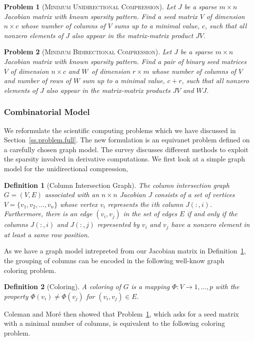 \documentclass[11pt, twoside,a4paper]{book}
\newtheorem{problem}{Problem}
\newtheorem{definition}{Definition}
\newcommand{\secref}[1]{Section~\protect\ref{#1}}
\newcommand{\defref}[1]{Definition~\protect\ref{#1}}
\newcommand{\col}{\ensuremath{c}}
\newcommand{\row}{\ensuremath{r}}
\newcommand{\MinUniCom}{\textsc{Minimum Unidirectional Compression}}
\newcommand{\MinBidCom}{\textsc{Minimum Bidirectional Compression}}
\begin{document}
\begin{problem}[\MinUniCom]
\label{p.seed.uni} Let $J$ be a sparse ${m\times n}$ Jacobian matrix with known sparsity
pattern. Find a seed matrix $V$ of dimension $n\times \col$
whose number of columns of $V$ sums up
to a minimal value, $\col$, such that all nonzero elements of $J$ also appear in
the matrix-matrix product $JV$.
\end{problem}

\begin{problem}[\MinBidCom]
\label{p.seed.bid} Let $J$ be a sparse ${m\times n}$ Jacobian matrix with known sparsity
pattern. Find a pair of binary seed matrices $V$ of dimension $n\times \col$ and $W$~of
dimension $\row \times m$ whose number of columns of $V$ and number of rows of $W$ sum up to a minimal value, $\col + \row$, such that all nonzero elements of $J$ also appear in
the matrix-matrix products $JV$ and $WJ$.
\end{problem}

\subsubsection{Combinatorial Model}
\label{s.modeling.full}
We reformulate the scientific computing problems which
we have discussed in \secref{ss.problem.full}.
The new formulation is an equivanet problem defined on a
carefully chosen graph model. The survey \cite{Gebremedhin05whatcolor}
discusses different methods
to exploit the sparsity involved in derivative computations.
We first look at a simple graph model for the unidirectional compression,
%
\begin{definition}[Column Intersection Graph]
\label{d:cig}
The column intersection graph $G = (V,E)$ associated with an $n \times n$ Jacobian $J$
consists of a set of vertices $V=\{v_1, v_2, \dots, v_n\}$ whose vertex $v_i$ represents
the $i$th column $J(:,i)$. Furthermore, there is an edge $(v_i,v_j)$ in the set of edges
$E$ if and only if the columns $J(:,i)$ and $J(:,j)$ represented by $v_i$ and $v_j$ have
a nonzero element in at least a same row position.
\end{definition}

As we have a graph model intrepreted from our Jacobian matrix in \defref{d:cig},
the grouping of columns can be encoded in the following well-know graph coloring problem.
%
\begin{definition}[Coloring]
A coloring of $G$ is a mapping $\Phi : V \to {1, \dots, p}$ with the property
$\Phi(v_i)\neq \Phi(v_j)$ for $(v_i,v_j) \in E$.
\end{definition}
%
Coleman and Mor\'{e} \cite{Coleman1983EoS} then showed that Problem~\ref{p.seed.uni}, which
asks for a seed matrix with a minimal number of columns, is equivalent to the following
coloring problem.
\end{document}
